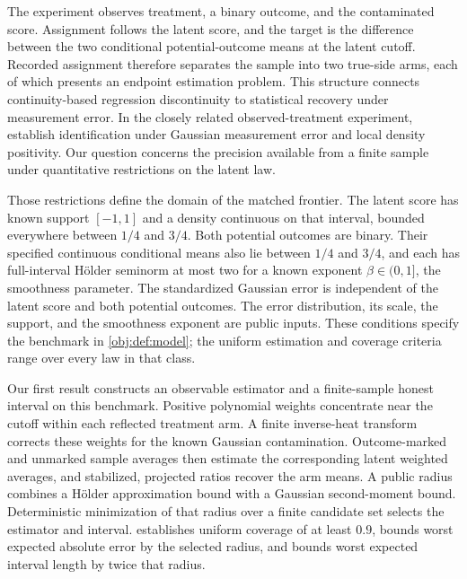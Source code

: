 The experiment observes treatment, a binary outcome, and the contaminated score. Assignment follows the latent score, and the target is the difference between the two conditional potential-outcome means at the latent cutoff. Recorded assignment therefore separates the sample into two true-side arms, each of which presents an endpoint estimation problem. This structure connects continuity-based regression discontinuity \citep{Hahn2001,CattaneoTitiunik2022Survey} to statistical recovery under measurement error. In the closely related observed-treatment experiment, \citet[Assumptions 1Y, 2C, and 7; Proposition 4(b)]{PeiShen2017DevilTails} establish identification under Gaussian measurement error and local density positivity. Our question concerns the precision available from a finite sample under quantitative restrictions on the latent law.

Those restrictions define the domain of the matched frontier. The latent score has known support \([-1,1]\) and a density continuous on that interval, bounded everywhere between \(1/4\) and \(3/4\). Both potential outcomes are binary. Their specified continuous conditional means also lie between \(1/4\) and \(3/4\), and each has full-interval Hölder seminorm at most two for a known exponent \(\beta\in(0,1]\), the smoothness parameter. The standardized Gaussian error is independent of the latent score and both potential outcomes. The error distribution, its scale, the support, and the smoothness exponent are public inputs. These conditions specify the benchmark in \cref{obj:def:model}; the uniform estimation and coverage criteria range over every law in that class.

Our first result constructs an observable estimator and a finite-sample honest interval on this benchmark. Positive polynomial weights concentrate near the cutoff within each reflected treatment arm. A finite inverse-heat transform corrects these weights for the known Gaussian contamination. Outcome-marked and unmarked sample averages then estimate the corresponding latent weighted averages, and stabilized, projected ratios recover the arm means. A public radius combines a Hölder approximation bound with a Gaussian second-moment bound. Deterministic minimization of that radius over a finite candidate set selects the estimator and interval.  establishes uniform coverage of at least \(0.9\), bounds worst expected absolute error by the selected radius, and bounds worst expected interval length by twice that radius.


